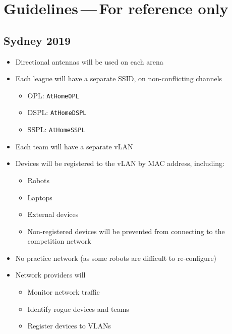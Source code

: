 \chapter[Guidelines]{Guidelines{\color{gray}\,---\,For reference only}}
\section{Sydney 2019}

\begin{itemize}[nosep]
	\item Directional antennas will be used on each arena
	\item Each league will have a separate SSID, on non-conflicting channels
	\begin{itemize}[nosep]
		\item OPL: \texttt{AtHomeOPL}
		\item DSPL: \texttt{AtHomeDSPL}
		\item SSPL: \texttt{AtHomeSSPL}
	\end{itemize}
	\item Each team will have a separate vLAN
	\item Devices will be registered to the vLAN by MAC address, including:
	\begin{itemize}[nosep]
		\item Robots
		\item Laptops
		\item External devices
		\item Non-registered devices will be prevented from connecting to the competition network
	\end{itemize}
	\item No practice network (as some robots are difficult to re-configure)
	\item Network providers will
	\begin{itemize}[nosep]
		\item Monitor network traffic
		\item Identify rogue devices and teams
		\item Register devices to VLANs
	\end{itemize}


\end{itemize}
